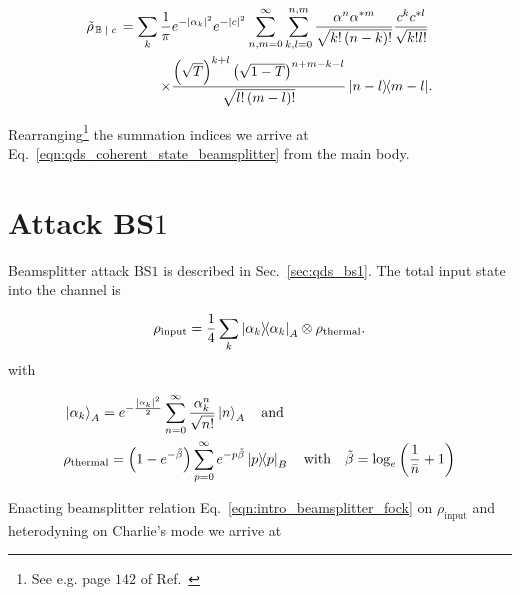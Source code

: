 \begin{align}
\tilde{\rho}_{\left. \mathbb{B} \given c \right.} = \sum_k \frac{1}{\pi} e^{-\left|\alpha_k\right|^2}  e^{-\left|c\right|^2} \sum_{n, m = 0}^\infty \sum_{k, l = 0}^{n, m} \frac{\alpha^n \alpha^{* m}}{\sqrt{k! \left(n - k\right)!}} \frac{c^k c^{* l}}{\sqrt{k! l!}}& \notag \\
%
\times\frac{\left(\sqrt{T}\right)^{k+l} \left(\sqrt{1-T}\right)^{n + m - k - l}}{\sqrt{l! \left(m-l\right)!}} \dyad{n-l}{m-l}&.
\end{align}

\noindent Rearranging\footnote{See e.g. page $142$ of Ref.~\cite{GerryandKnight}} the summation indices we arrive at Eq.~\ref{eqn:qds_coherent_state_beamsplitter} from the main body.

\section{Attack BS$1$}\label{appendix:bs1}
Beamsplitter attack BS$1$ is described in Sec.~\ref{sec:qds_bs1}. The total input state into the channel is 

\begin{equation}\label{eqn:qds_bs1_input_state}
\rho_{\text{input}} = \frac{1}{4}\sum_k \dyad{\alpha_k}_A \otimes \rho_{\text{thermal}}.
\end{equation}
with 

\begin{align}
&\ket{\alpha_k}_A = e^{- \frac{\left| \alpha_k \right|^2}{2}} \sum_{n=0}^\infty \frac{\alpha_k^n}{\sqrt{n!}} \ket{n}_A \qq{and}\notag \\
&\rho_{\text{thermal}} = \left(1 - e^{-\tilde{\beta}}\right) \sum_{p=0}^\infty e^{- p \tilde{\beta}}\dyad{p}_B \qq{with} \tilde{\beta} = \log_e\left(\frac{1}{\bar{n}} +1\right)
\end{align}



\noindent Enacting beamsplitter relation Eq.~\ref{eqn:intro_beamsplitter_fock} on $\rho_{\text{input}}$ and heterodyning on Charlie's mode we arrive at %

